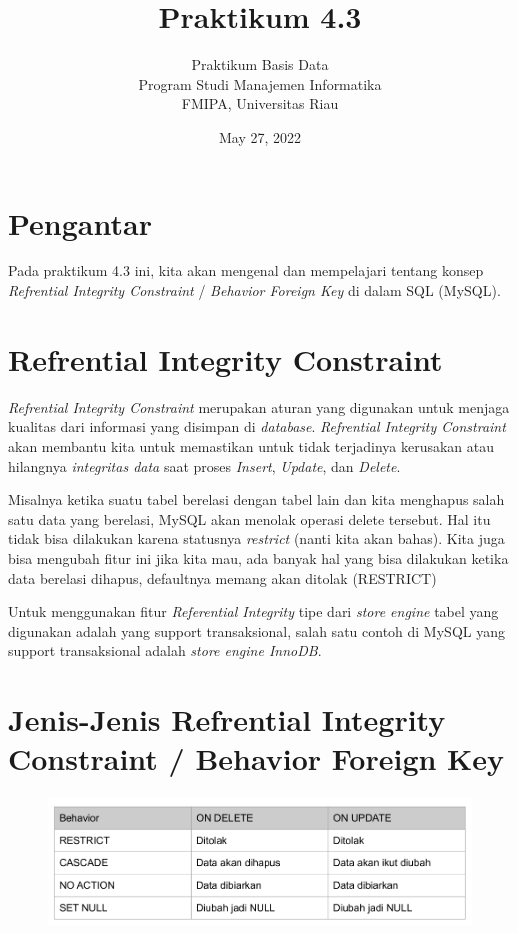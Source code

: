 \documentclass[a4paper]{article}
\title{Praktikum 4.3}
\author{Praktikum Basis Data\\ Program Studi Manajemen Informatika \\ FMIPA, Universitas Riau }
\date{May 27, 2022}
\begin{document}
\maketitle

\section{Pengantar}%
\label{sec:pengantar}

Pada praktikum 4.3 ini, kita akan mengenal dan mempelajari tentang konsep \textit{Refrential Integrity Constraint} /  \textit{Behavior Foreign Key} di dalam SQL (MySQL).

\section{Refrential Integrity Constraint}%
\label{sec:section_name}

\textit{Refrential Integrity Constraint} merupakan aturan yang digunakan untuk menjaga kualitas dari informasi yang disimpan di \textit{database}. \textit{Refrential  Integrity Constraint} akan membantu kita untuk memastikan untuk tidak terjadinya kerusakan atau hilangnya \textit{integritas data} saat proses \textit{Insert}, \textit{Update}, dan \textit{Delete}.

Misalnya ketika suatu tabel berelasi dengan tabel lain dan kita menghapus salah satu data yang berelasi, MySQL akan menolak operasi delete tersebut. Hal itu tidak bisa dilakukan karena statusnya \textit{restrict} (nanti kita akan bahas).  Kita juga bisa mengubah fitur ini jika kita mau, ada banyak hal yang bisa dilakukan ketika data berelasi dihapus, defaultnya memang akan ditolak (RESTRICT)

Untuk menggunakan fitur \textit{Referential Integrity} tipe dari \textit{store engine} tabel yang digunakan adalah yang support transaksional, salah satu contoh di MySQL yang support transaksional adalah \textit{store engine InnoDB}. 

\section{Jenis-Jenis Refrential Integrity Constraint / Behavior Foreign Key}%
\label{sec:section_name}
\begin{figure}[htpb]
	\centering
	\includegraphics[width=0.8\linewidth]{pic/behavior-fk.png}
\end{figure}
\end{document}
